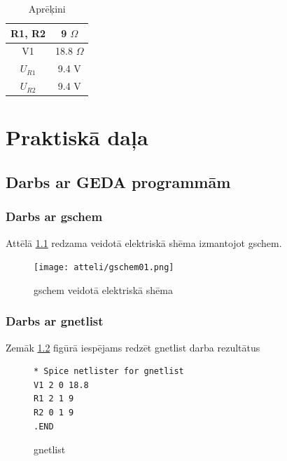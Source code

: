 \documentclass{report}
\begin{document}
\begin{table}[h]
\centering
\caption{Aprēķini}
\label{i:tabula}
\begin{tabular}[h]{|c|c|}
\hline
R1, R2 & 9 $\Omega$ \\
\hline
V1 & 18.8 $\Omega$ \\
\hline
$U_{R1}$ & 9.4 V \\
\hline
$U_{R2}$ & 9.4 V \\
\hline
\end{tabular}
\end{table}

\chapter{Praktiskā daļa}
\section{Darbs ar GEDA programmām}

\subsection{Darbs ar gschem}
Attēlā \ref{i:gschem} redzama veidotā elektriskā shēma izmantojot gschem.

\begin{figure}[!b]
\texttt{[image: atteli/gschem01.png]}
\caption{gschem veidotā elektriskā shēma}
\label{i:gschem}
\end{figure}

\subsection{Darbs ar gnetlist}
Zemāk \ref{i:gnetlist} figūrā iespējams redzēt gnetlist darba rezultātus 
\begin{figure}[h!]
\caption{gnetlist}
\label{i:gnetlist}
\begin{verbatim}
* Spice netlister for gnetlist
V1 2 0 18.8
R1 2 1 9
R2 0 1 9
.END
\end{verbatim}
\end{figure}
\end{document}
